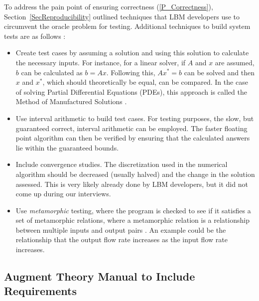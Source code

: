 \documentclass[final, 3p, times, authoryear]{elsarticle}
\begin{document}
To address the pain point of ensuring correctness (\ref{P_Correctness}),
Section~\ref{SecReproducibility} outlined techniques that LBM developers use to
circumvent the oracle problem for testing.  Additional techniques to build
system tests are as follows \citep{Smith2016}: 

\begin{itemize}

\item Create test cases by assuming a solution and using this solution to
  calculate the necessary inputs.  For instance, for a linear solver, if $A$ and
  $x$ are assumed, $b$ can be calculated as $b = A x$.  Following this, $A x^* =
  b$ can be solved and then $x$ and $x^*$, which should theoretically be equal,
  can be compared.  In the case of solving Partial Differential Equations
  (PDEs), this approach is called the Method of Manufactured Solutions
  \citep{Roache1998}.
\item Use interval arithmetic to build test cases.  For testing purposes, the
  slow, but guaranteed correct, interval arithmetic \citep{Hickey2001} can be
  employed. The faster floating point algorithm can then be verified by ensuring
  that the calculated answers lie within the guaranteed bounds.
\item Include convergence studies.  The discretization used in the numerical
  algorithm should be decreased (usually halved) and the change in the solution
  assessed.  This is very likely already done by LBM developers, but it did not
  come up during our interviews.
\item Use \emph{metamorphic} testing, where the program is checked to see if it
  satisfies a set of metamorphic relations, where a metamorphic relation is a
  relationship between multiple inputs and output pairs
  \citep{KanewalaAndLundgren2016}.  An example could be the relationship that
  the output flow rate increases as the input flow rate increases.
\end{itemize}

\subsection{Augment Theory Manual to Include Requirements}
\end{document}
